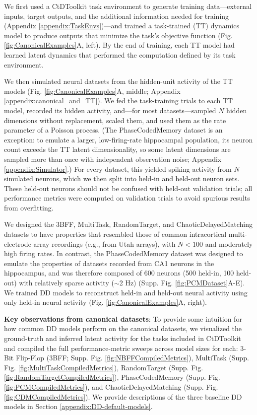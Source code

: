 \documentclass{article}
\begin{document}
We first used a CtDToolkit task environment to generate training data—external inputs, target outputs, and the additional information needed for training (Appendix \ref{appendix:TaskEnvs})—and trained a task-trained (TT) dynamics model to produce outputs that minimize the task's objective function (Fig. \ref{fig:CanonicalExamples}A, left). By the end of training, each TT model had learned latent dynamics that performed the computation defined by its task environment.

We then simulated neural datasets from the hidden-unit activity of the TT models (Fig. \ref{fig:CanonicalExamples}A, middle; Appendix \ref{appendix:canonical_and_TT}). We fed the task-training trials to each TT model, recorded its hidden activity, and—for most datasets—sampled $N$ hidden dimensions without replacement, scaled them, and used them as the rate parameter of a Poisson process. (The PhaseCodedMemory dataset is an exception: to emulate a larger, low-firing-rate hippocampal population, its neuron count exceeds the TT latent dimensionality, so some latent dimensions are sampled more than once with independent observation noise; Appendix \ref{appendix:Simulator}.) For every dataset, this yielded spiking activity from $N$ simulated neurons, which we then split into held-in and held-out neuron sets. These held-out neurons should not be confused with held-out validation trials; all performance metrics were computed on validation trials to avoid spurious results from overfitting.

We designed the 3BFF, MultiTask, RandomTarget, and ChaoticDelayedMatching datasets to have properties that resembled those of common intracortical multi-electrode array recordings (e.g., from Utah arrays), with $N < 100$ and moderately high firing rates. In contrast, the PhaseCodedMemory dataset was designed to emulate the properties of datasets recorded from CA1 neurons in the hippocampus, and was therefore composed of 600 neurons (500 held-in, 100 held-out) with relatively sparse activity ($\sim$2 Hz) (Supp. Fig. \ref{fig:PCMDataset}A-E). We trained DD models to reconstruct held-in and held-out neural activity using only held-in neural activity (Fig. \ref{fig:CanonicalExamples}A, right).

\textbf{Key observations from canonical datasets}:
To provide some intuition for how common DD models perform on the canonical datasets, we visualized the ground-truth and inferred latent activity for the tasks included in CtDToolkit and compiled the full performance-metric sweeps across model sizes for each: 3-Bit Flip-Flop (3BFF; Supp. Fig. \ref{fig:NBFFCompiledMetrics}), MultiTask (Supp. Fig. \ref{fig:MultiTaskCompiledMetrics}), RandomTarget (Supp. Fig. \ref{fig:RandomTargetCompiledMetrics}), PhaseCodedMemory (Supp. Fig. \ref{fig:PCMCompiledMetrics}), and ChaoticDelayedMatching (Supp. Fig. \ref{fig:CDMCompiledMetrics}). We provide descriptions of the three baseline DD models in Section \ref{appendix:DD-default-models}.
\end{document}
